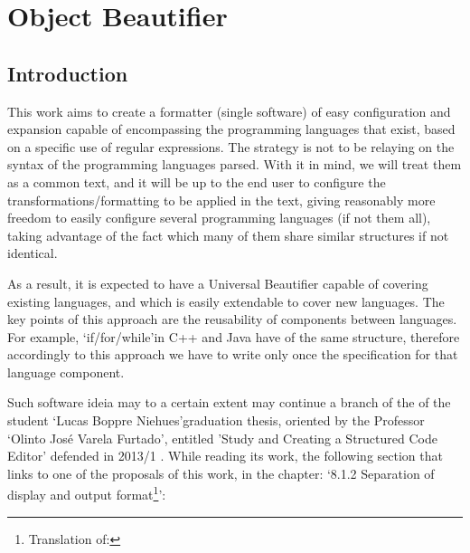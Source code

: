 

%


\chapter{Object Beautifier}


\begin{englishtext}

    \section{Introduction}

    This work aims to create a formatter (single software) of easy configuration
    and expansion capable of encompassing the programming languages that exist,
    based on a specific use of regular expressions. The strategy is not to be
    relaying on the syntax of the programming languages parsed. With it in mind,
    we will treat them as a common text, and it will be up to the end user to
    configure the transformations/formatting to be applied in the text, giving
    reasonably more freedom to easily configure several programming languages
    (if not them all), taking advantage of the fact which many of them share
    similar structures if not identical.

    As a result, it is expected to have a Universal Beautifier capable of
    covering existing languages, and which is easily extendable to cover new
    languages. The key points of this approach are the reusability of components
    between languages. For example, `if/for/while'\s in C++ and Java have of the
    same structure, therefore accordingly to this approach we have to write only
    once the specification for that language component.

    Such software ideia may to a certain extent may continue a branch of the of
    the student `Lucas Boppre Niehues'\s graduation thesis, oriented by the
    Professor `Olinto José Varela Furtado', entitled 'Study and Creating a
    Structured Code Editor' defended in 2013/1 \cite{structuredEditorStudy}.
    While reading its work, the following section that links to one of the
    proposals of this work, in the chapter: `8.1.2 Separation of display and
    output format\footnote{Translation of: }':


\end{englishtext}
